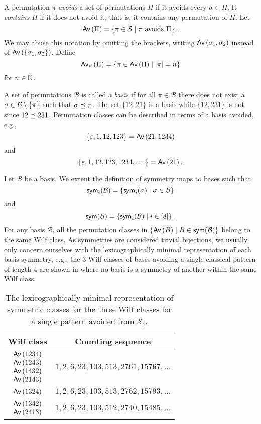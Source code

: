 A permutation $\pi$ \emph{avoids} a set of permutations $\Pi$ if it avoids every $\sigma \in \Pi$. It \emph{contains} $\Pi$ if it does not avoid it, that is, it contains any permutation of $\Pi$. Let 
\[
    \Av{\Pi} = \cset{\pi \in \mathcal{S}}{\pi \text{ avoids } \Pi}.
\]
We may abuse this notation by omitting the brackets, writing $\Av{\sigma_1,\sigma_2}$ instead of $\Av{\set{\sigma_1,\sigma_2}}$. Define \[
    \Avn{n}{\Pi} = \cset{\pi \in \Av{\Pi}}{|\pi| = n}
\]
for $n\in\N$.

A set of permutations $\mathcal{B}$ is called a \emph{basis} if for all $\pi\in\mathcal{B}$ there does not exist a $\sigma \in \mathcal{B} \setminus \set{\pi}$ such that $\contains{\pi}{\sigma}$. The set $\{12,21\}$ is a basis while $\{12,231\}$ is not since $\contains{231}{12}$. Permutation classes can be described in terms of a basis avoided, e.g., 
\[
    \{\varepsilon,1,12,123\} = \Av{21, 1234}
\]
and
\[
    \{\varepsilon, 1, 12, 123, 1234,\dotsc\} = \Av{21}.
\]

Let $\mathcal{B}$ be a basis. We extent the definition of symmetry maps to bases such that
\[
    \sym_i(\mathcal{B}) = \cset{\sym_i(\sigma)}{\sigma \in \mathcal{B}}
\]
and
\[
    \sym(\mathcal{B}) = \cset{\sym_i(\mathcal{B})}{i \in [8]}.
\]
For any basis $\mathcal{B}$, all the permutation classes in $\cset{\Av{B}}{B \in \sym(\mathcal{B})}$ belong to the same Wilf class. As symmetries are considered trivial bijections, we usually only concern ourselves with the lexicographically minimal representation of each basis symmetry, e.g., the 3 Wilf classes of bases avoiding a single classical pattern of length $4$ are shown in  where no basis is a symmetry of another within the same Wilf class.

\begin{table}[ht!]
    \centering
    \begin{tabular}{c|c}
        Wilf class & Counting sequence\\
        \hline
        $\begin{matrix}\Av{1234}\\\Av{1243}\\\Av{1432}\\\Av{2143}\end{matrix}$ & $1, 2, 6, 23, 103, 513, 2761, 15767, \dotsc$ \\
        \hline
        $\begin{matrix}\Av{1324}\end{matrix}$ & $1, 2, 6, 23, 103, 513, 2762, 15793,\dotsc$\\
        \hline
        $\begin{matrix}\Av{1342}\\\Av{2413}\end{matrix}$ & $1, 2, 6, 23, 103, 512, 2740, 15485,\dotsc$
    \end{tabular}
    \caption{The lexicographically minimal representation of symmetric classes for the three Wilf classes for a single pattern avoided from $\mathcal{S}_4$.}
    \label{tab:wilfcls4}
\end{table}





